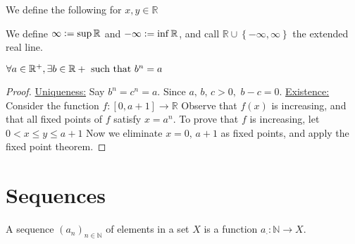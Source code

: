 We define the following for $x,y\in\mathbb{R}$

\begin{definition}
We define $\infty\mathrel{\mathop:}=\sup\mathbb{R}$ and $-\infty\mathrel{\mathop:}=\inf\mathbb{R}$, and call $\mathbb{R}\cup\left\{ -\infty,\infty\right\}$ the extended real line.
\end{definition}

\begin{theorem}
    $\forall a\in\mathbb{R}^+,\exists b\in\mathbb{R}+\text{ such that } b^n=a$
\end{theorem}
\begin{proof}
    \underline{Uniqueness:} Say $b^n=c^n=a.$
    Since $a,\,b,\,c>0,$ $b-c=0$.
    \underline{Existence:} Consider the function $f:[0,a+1]\to\mathbb{R}$
    Observe that $f(x)$ is increasing, and that all fixed points of $f$ satisfy $x=a^n$. To prove that $f$ is increasing, let $0<x\leq y\leq a+1$
    Now we eliminate $x=0,\,a+1$ as fixed points, and apply the fixed point theorem.
\end{proof}

\section{Sequences}
\begin{definition}[Sequence]
    A sequence $(a_n)_{n\in\mathbb{N}}$ of elements in a set $X$ is a function $a_\cdot:\mathbb{N}\rightarrow X$.
\end{definition}

